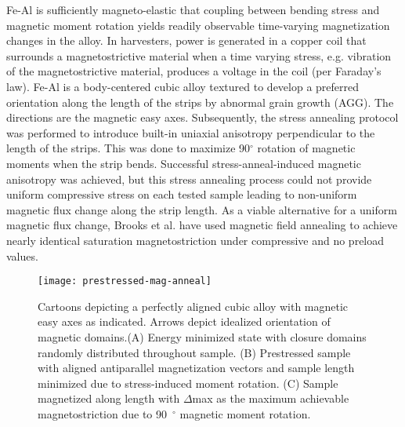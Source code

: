 Fe-Al is sufficiently magneto-elastic that coupling between bending stress and magnetic moment rotation yields readily observable time-varying magnetization changes in the alloy. In harvesters, power is generated in a copper coil that surrounds a magnetostrictive material when a time varying stress, e.g. vibration of the magnetostrictive material, produces a voltage in the coil (per Faraday’s law)\cite{Yoo2012}. Fe-Al is a body-centered cubic alloy textured to develop a  preferred orientation along the length of the strips by abnormal grain growth (AGG)\cite{Na2014,Na2014b,Na2013a}. The  directions are the magnetic easy axes. Subsequently, the stress annealing protocol was performed to introduce built-in uniaxial anisotropy perpendicular to the length of the strips\cite{Yoo2009}.  This was done to maximize 90$^{\circ}$ rotation of magnetic moments when the strip bends. Successful stress-anneal-induced magnetic anisotropy was achieved, but this stress annealing process could not provide uniform compressive stress on each tested sample leading to non-uniform magnetic flux change along the strip length. As a viable alternative for a uniform magnetic flux change, Brooks et al. have used magnetic field annealing to achieve nearly identical saturation magnetostriction under compressive and no preload values\cite{Brooks2012}. 

\begin{figure}[h]
	\centering
	\texttt{[image: prestressed-mag-anneal]}
	\caption{Cartoons depicting a perfectly aligned cubic alloy with \hkl<100> magnetic easy axes as indicated. Arrows depict idealized orientation of magnetic domains.(A) Energy minimized state with closure domains randomly distributed throughout sample.  (B) Prestressed sample with aligned antiparallel magnetization vectors and sample length minimized due to stress-induced moment rotation. (C) Sample magnetized along length with $\Delta$max as the maximum achievable magnetostriction due to 90~$^{\circ}$ magnetic moment rotation.}
	\label{fig:prestressed-mag-anneal}
\end{figure}


